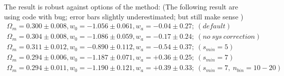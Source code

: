 \documentclass[useAMS,usenatbib]{mnras}
\begin{document}
The result is robust against options of the method:
(The following result are using code with bug; error bars slightly underestimated; 
but still make sense )
\begin{eqnarray}
 \Omega_m = 0.300 \pm 0.008, w_0 = -1.056 \pm 0.061, w_a = -0.04 \pm 0.27;\ (default)\\
 \Omega_m = 0.304 \pm 0.008, w_0 = -1.086 \pm 0.059, w_a = -0.17 \pm 0.24;\ (no\ sys\ correction)\\
 \Omega_m = 0.311 \pm 0.012, w_0 = -0.890 \pm 0.112, w_a = -0.54 \pm 0.37;\ (s_{min}=5)\\
 \Omega_m = 0.294 \pm 0.006, w_0 = -1.187 \pm 0.071, w_a = +0.36 \pm 0.25;\ (s_{min}=7)\\
 \Omega_m = 0.294 \pm 0.011, w_0 = -1.190 \pm 0.121, w_a = +0.39 \pm 0.33;\ (s_{min}=7,\ n_{bin}=10-20)\\

\end{eqnarray}
\end{document}
